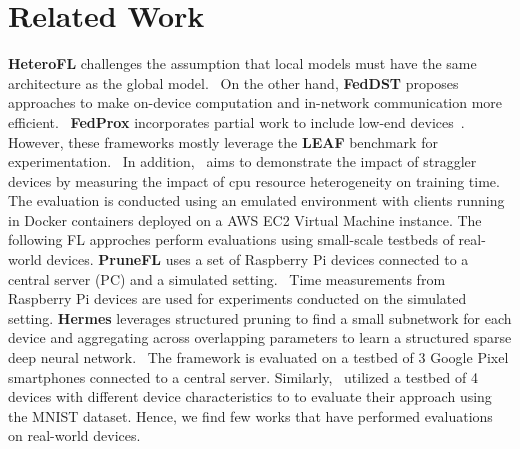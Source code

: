 \section{Related Work}
    \textbf{HeteroFL} challenges the assumption that local models must have the same architecture as the global model.~\cite{DBLP:journals/corr/abs-2010-01264} On the other hand, \textbf{FedDST} proposes approaches to make on-device computation and in-network communication more efficient.~\cite{DBLP:journals/corr/abs-2112-09824} \textbf{FedProx} incorporates partial work to include low-end devices~\cite{DBLP:journals/corr/abs-1812-06127}. However, these frameworks mostly leverage the \textbf{LEAF} benchmark for experimentation.~\cite{DBLP:journals/corr/abs-1812-01097} In addition,~\cite{232971} aims to demonstrate the impact of straggler devices by measuring the impact of cpu resource heterogeneity on training time. The evaluation is conducted using an emulated environment with clients running in Docker containers deployed on a AWS EC2 Virtual Machine instance. The following FL approches perform evaluations using small-scale testbeds of real-world devices. \textbf{PruneFL} uses a set of Raspberry Pi devices connected to a central server (PC) and a simulated setting.~\cite{DBLP:journals/corr/abs-1909-12326} Time measurements from Raspberry Pi devices are used for experiments conducted on the simulated setting. \textbf{Hermes} leverages structured pruning to find a small subnetwork for each device and aggregating across overlapping parameters to learn a structured sparse deep neural network.~\cite{10.1145/3447993.3483278} The framework is evaluated on a testbed of 3 Google Pixel smartphones connected to a central server. Similarly,~\cite{9139810} utilized a testbed of 4 devices with different device characteristics to to evaluate their approach using the MNIST dataset. Hence, we find few works that have performed evaluations on real-world devices.

